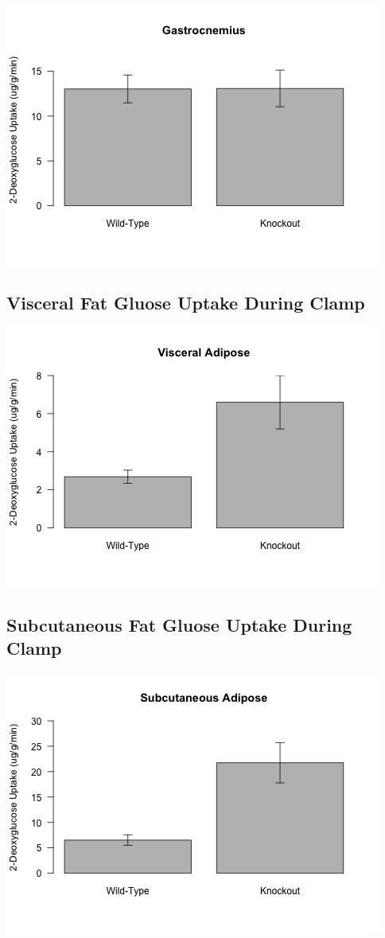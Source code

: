\documentclass[]{article}
\begin{document}
\includegraphics{figures/gastroc-1.png}

\subsection{Visceral Fat Gluose Uptake During
Clamp}\label{visceral-fat-gluose-uptake-during-clamp}

\includegraphics{figures/v-fat-1.png}

\subsection{Subcutaneous Fat Gluose Uptake During
Clamp}\label{subcutaneous-fat-gluose-uptake-during-clamp}

\includegraphics{figures/s-fat-1.png}
\end{document}
